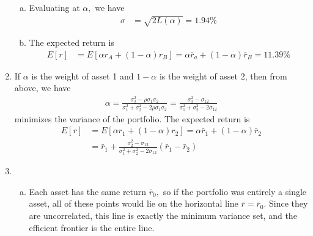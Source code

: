 \documentclass{article}
\begin{document}
\begin{enumerate}
\begin{enumerate}[(a)]
			\item 
				\begin{soln}
					Evaluating at $\alpha,$ we have
					\begin{align*}
						\sigma &= \sqrt{2L(\alpha)} = 1.94\%
					\end{align*}
				\end{soln}

			\item 
				\begin{soln}
					The expected return is
					\begin{align*}
						E[r] &= E[\alpha r_A + (1-\alpha)r_B] = \alpha \bar r_a + (1-\alpha)\bar r_B = 11.39\%
					\end{align*}
				\end{soln}

		\end{enumerate}

	\item 
		\begin{soln}
			If $\alpha$ is the weight of asset 1 and $1-\alpha$ is the weight of asset 2, then from above, we have
			\begin{align*}
				\alpha = \frac{\sigma_2^2 - \rho\sigma_1\sigma_2}{\sigma_1^2+\sigma_2^2-2\rho\sigma_1\sigma_2} = \frac{\sigma_2^2 - \sigma_{12}}{\sigma_1^2+\sigma_2^2-2\sigma_{12}}
			\end{align*}
			minimizes the variance of the portfolio. The expected return is
			\begin{align*}
				E[r] &= E[\alpha r_1+(1-\alpha) r_2] = \alpha \bar r_1 + (1-\alpha)\bar r_2 \\
				&= \bar r_1 + \frac{\sigma_2^2-\sigma_{12}}{\sigma_1^2+\sigma_2^2-2\sigma_{12}}(\bar r_1-\bar r_2)
			\end{align*}
		\end{soln}

	\item
		\begin{enumerate}[(a)]
			\item 
				\begin{soln}
					Each asset has the same return $\bar r_0,$ so if the portfolio was entirely a single asset, all of these points would lie on the horizontal line $\bar r = \bar r_0.$ Since they are uncorrelated, this line is exactly the minimum variance set, and the efficient frontier is the entire line.
				\end{soln}


\end{enumerate}
\end{enumerate}
\end{document}
